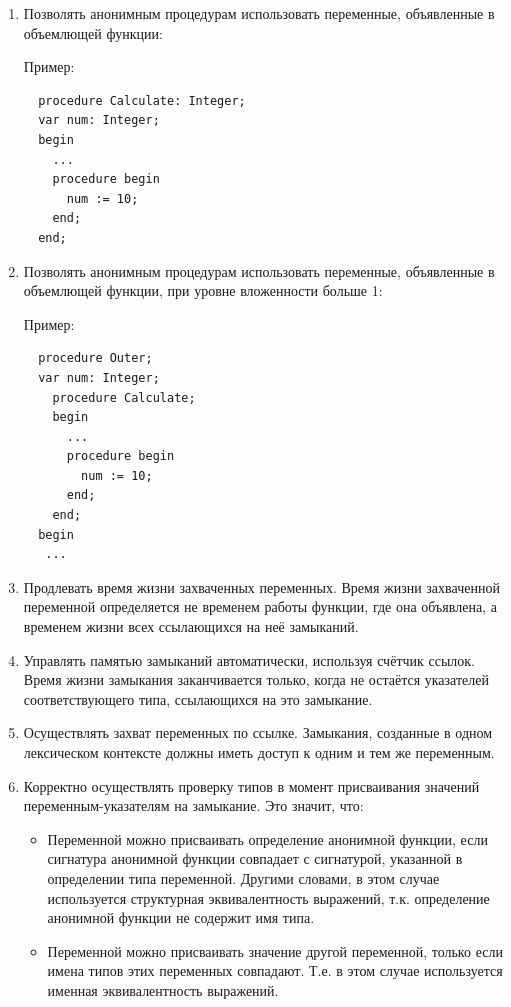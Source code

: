 \documentclass{imcs}
\begin{document}
\begin{enumerate}

    \item Позволять анонимным процедурам использовать переменные, объявленные в объемлющей функции:

Пример:
\begin{lstlisting}
  procedure Calculate: Integer;
  var num: Integer;
  begin
    ...
    procedure begin
      num := 10;
    end;
  end;
\end{lstlisting}

    \item Позволять анонимным процедурам использовать переменные, объявленные в объемлющей функции, при уровне вложенности больше 1:

Пример:
\begin{lstlisting}
  procedure Outer;
  var num: Integer;
    procedure Calculate;
    begin
      ...
      procedure begin
        num := 10;
      end;
    end;
  begin
   ...
\end{lstlisting}

    \item Продлевать время жизни захваченных переменных. Время жизни захваченной переменной определяется не временем работы функции, где она объявлена, а временем жизни всех ссылающихся на неё замыканий.

    \item Управлять памятью замыканий автоматически, используя счётчик ссылок. Время жизни замыкания заканчивается
 только, когда не остаётся указателей соответствующего типа, ссылающихся на это замыкание.
      
    \item Осуществлять захват переменных по ссылке. Замыкания, созданные в одном лексическом контексте должны иметь доступ к одним и тем же переменным.
      
    \item Корректно осуществлять проверку типов в момент присваивания значений переменным-указателям на замыкание. Это значит, что:
        \begin{itemize}
            \item Переменной можно присваивать определение анонимной функции, если сигнатура анонимной функции
совпадает с сигнатурой, указанной в определении типа переменной. Другими словами, в этом случае используется
структурная эквивалентность выражений, т.к. определение анонимной функции не содержит имя типа.
            \item Переменной можно присваивать значение другой переменной, только если имена типов этих переменных
совпадают. Т.е. в этом случае используется именная эквивалентность выражений.
        \end{itemize}


\end{enumerate}
\end{document}
